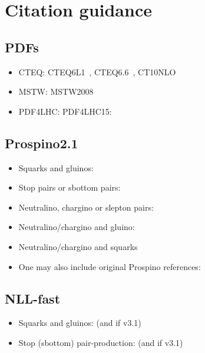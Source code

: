 \documentclass{article}
\begin{document}
\section*{Citation guidance}

\subsection*{PDFs}
\begin{itemize}
 \item CTEQ: CTEQ6L1~\cite{Pumplin:2002vw}, CTEQ6.6~\cite{Nadolsky:2008zw}, CT10NLO~\cite{Lai:2010vv}
 \item MSTW: MSTW2008~\cite{Martin:2009iq}
 \item PDF4LHC: PDF4LHC15:~\cite{Butterworth:2015oua}
\end{itemize}

\subsection*{Prospino2.1}
\begin{itemize}
 \item Squarks and gluinos:
       \cite{ProspinoWeb,Beenakker:1996ch}
 \item Stop pairs or sbottom pairs:
       \cite{ProspinoWeb,Beenakker:1997ut}
 \item Neutralino, chargino or slepton pairs:
       \cite{ProspinoWeb,Beenakker:1999xh}
 \item Neutralino/chargino and gluino:
       \cite{ProspinoWeb,Spira:2002rd,Plehn:2004rp}
 \item Neutralino/chargino and squarks
       \cite{ProspinoWeb,Plehn:2004rp}
 \item One may also include original Prospino references:
       \cite{Beenakker:1996ed,Beenakker:1994an,Beenakker:1995fp,Beenakker:1996ch}
\end{itemize}

\subsection*{NLL-fast}
\begin{itemize}
 \item Squarks and gluinos:
       \cite{NLLfastWeb,Beenakker:1996ch,Kulesza:2008jb,Kulesza:2009kq,Beenakker:2009ha,Beenakker:2011fu} (and \cite{Beenakker:2015rna} if v3.1)
 \item Stop (sbottom) pair-production:
       \cite{NLLfastWeb,Beenakker:1997ut,Beenakker:2010nq,Beenakker:2011fu} (and \cite{Beenakker:2015rna} if v3.1)
\end{itemize}
\end{document}
